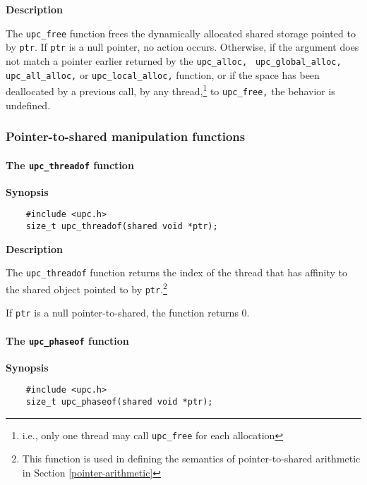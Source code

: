 {\bf Description}

\np The {\tt upc\_free} function frees the dynamically
    allocated shared storage pointed to by {\tt ptr}.  If {\tt ptr} is
    a null pointer, no action occurs.  Otherwise, if the argument does
    not match a pointer earlier returned by the {\tt upc\_alloc, } 
    {\tt upc\_global\_alloc,}  {\tt upc\_all\_alloc,}  or {\tt upc\_local\_alloc,} function,
    or if the space has been deallocated by a previous call, by any 
    thread,\footnote{i.e., only one thread may call {\tt upc\_free} for
     each allocation} to {\tt upc\_free,} the behavior is undefined.

\subsubsection{Pointer-to-shared manipulation functions}

\paragraph{The {\tt upc\_threadof} function}
\label{upc_threadof}

{\bf Synopsis} 

\npf\vspace{-2.5em}
\begin{verbatim}
    #include <upc.h> 
    size_t upc_threadof(shared void *ptr); 
\end{verbatim}

{\bf Description}

\np The {\tt upc\_threadof} function returns the index of the
   thread that has affinity to the shared object pointed to by {\tt ptr}.\footnote{%
   This function is used in defining the semantics of pointer-to-shared
   arithmetic in Section \ref{pointer-arithmetic}}

\np If {\tt ptr} is a null pointer-to-shared, the function returns 0.


\paragraph{The {\tt upc\_phaseof} function}
\label{upc_phaseof}

{\bf Synopsis} 

\npf\vspace{-2.5em}
\begin{verbatim}
    #include <upc.h> 
    size_t upc_phaseof(shared void *ptr); 
\end{verbatim}

